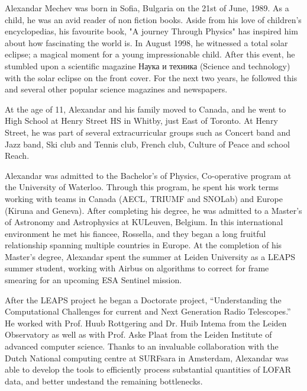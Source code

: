 Alexandar Mechev was born in Sofia, Bulgaria on the 21st of June, 1989. As a child, he was an avid reader of non fiction books. Aside from his love of children's encyclopedias, his favourite book, "A journey Through Physics" has inspired him about how fascinating the world is. In August 1998, he witnessed a total solar eclipse; a magical moment for a young impressionable child. After this event, he stumbled upon a scientific magazine Наука и техника (Science and technology) with the solar eclipse on the front cover. For the next two years, he followed this and several other popular science magazines and newspapers.

At the age of 11, Alexandar and his family moved to Canada, and he went to High School at Henry Street HS in Whitby, just East of Toronto. At Henry Street, he was part of several extracurricular groups such as Concert band and Jazz band, Ski club and Tennis club, French club, Culture of Peace and school Reach. 

Alexandar was admitted to the Bachelor's of Physics, Co-operative program at the University of Waterloo. Through this program, he spent his work terms working with teams in Canada (AECL, TRIUMF and SNOLab) and Europe (Kiruna and Geneva). After completing his degree, he was admitted to a Master's of Astronomy and Astrophysics at KULeuven, Belgium. In this international environment he met his fiancee, Rossella, and they began a long fruitful relationship spanning multiple countries in Europe. At the completion of his Master's degree, Alexandar spent the summer at Leiden University as a LEAPS summer student, working with Airbus on algorithms to correct for frame smearing for an upcoming ESA Sentinel mission. 

After the LEAPS project he began a Doctorate project, ``Understanding the Computational Challenges for current and Next Generation Radio Telescopes.'' He worked with Prof. Huub Rottgering and Dr. Huib Intema from the Leiden Observatory as well as with Prof. Aske Plaat from the Leiden Institute of advanced computer science. Thanks to an invaluable collaboration with the Dutch National computing centre at SURFsara in Amsterdam, Alexandar was able to develop the tools to efficiently process substantial quantities of LOFAR data, and better undestand the remaining bottlenecks. 

 
 

